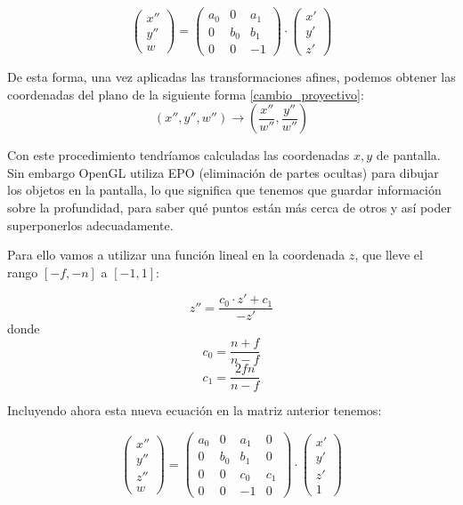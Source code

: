 \documentclass[a4paper,11pt, oneside]{book}
\begin{document}
$$\begin{pmatrix}
x''\\
y''\\
w
\end{pmatrix}=
\begin{pmatrix}
	a_0 & 0&a_1\\
	0&b_0&b_1\\
	0&0&-1
\end{pmatrix}\cdot
\begin{pmatrix}
x'\\
y'\\
z'
\end{pmatrix}
$$


De esta forma, una vez aplicadas las transformaciones afines, podemos obtener las coordenadas del plano de la siguiente forma \ref{cambio_proyectivo}:
\begin{equation}
(x'',y'',w'') \rightarrow (\frac{x''}{w''}, \frac{y''}{w''})
\end{equation}


Con este procedimiento tendríamos calculadas las coordenadas $x,y$ de pantalla. Sin embargo OpenGL utiliza EPO (eliminación de partes ocultas) para dibujar los objetos en la pantalla, lo que significa que tenemos que guardar información sobre la profundidad, para saber qué puntos están más cerca de otros y así poder superponerlos adecuadamente. 

Para ello vamos a  utilizar una función lineal en la coordenada $z$, que lleve el rango $[-f,-n]$ a $[-1,1]$:

\begin{equation}
z'' = \frac{c_0\cdot z'+c_1}{-z'}
\end{equation}
donde
\begin{equation}
c_0 = \frac{n+f}{n-f}
\end{equation}
\begin{equation}
c_1 = \frac{2fn}{n-f}
\end{equation}

Incluyendo ahora esta nueva ecuación en la matriz anterior tenemos:

$$\begin{pmatrix}
x''\\
y''\\
z'' \\
w
\end{pmatrix}=
\begin{pmatrix}
a_0 & 0&a_1&0\\
0&b_0&b_1&0\\
0&0&c_0&c_1\\
0&0&-1&0
\end{pmatrix}\cdot 
\begin{pmatrix}
x'\\
y'\\
z'\\
1
\end{pmatrix}
$$
\end{document}
